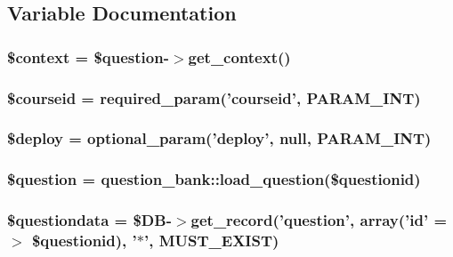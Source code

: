 \subsection{Variable Documentation}
\hypertarget{deploy_8php_ae05dedb802ada0155efdece2044fed64}{
\subsubsection[{\$context}]{\setlength{\rightskip}{0pt plus 5cm}\$context = \$question-\/$>$get\_\-context()}}
\label{deploy_8php_ae05dedb802ada0155efdece2044fed64}
\hypertarget{deploy_8php_a2a1b481ca3e5ae5c2d7a66d271302f23}{
\subsubsection[{\$courseid}]{\setlength{\rightskip}{0pt plus 5cm}\$courseid = required\_\-param('courseid', PARAM\_\-INT)}}
\label{deploy_8php_a2a1b481ca3e5ae5c2d7a66d271302f23}
\hypertarget{deploy_8php_a779ebfa548d45444c88971ad5a5657e8}{
\subsubsection[{\$deploy}]{\setlength{\rightskip}{0pt plus 5cm}\$deploy = optional\_\-param('deploy', null, PARAM\_\-INT)}}
\label{deploy_8php_a779ebfa548d45444c88971ad5a5657e8}
\hypertarget{deploy_8php_acf0d1ba8b3999333306bf1a4fd363e93}{
\subsubsection[{\$question}]{\setlength{\rightskip}{0pt plus 5cm}\$question = question\_\-bank::load\_\-question(\$questionid)}}
\label{deploy_8php_acf0d1ba8b3999333306bf1a4fd363e93}
\hypertarget{deploy_8php_ab3dbd2b3f38fc871b3aba59ed0657c55}{
\subsubsection[{\$questiondata}]{\setlength{\rightskip}{0pt plus 5cm}\$questiondata = \$DB-\/$>$get\_\-record('question', array('id' =$>$ \$questionid), '$\ast$', MUST\_\-EXIST)}}
